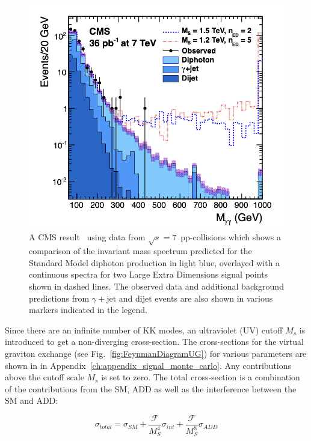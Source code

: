 \begin{figure}
    \centering
    \includegraphics[scale=0.6]{fig/InvariantMass.png}
    \caption{A CMS result~\cite{CMS:2011uvc} using data from $\sqrt{s} = 7$~\TeV pp-collisions which shows a comparison of the invariant mass spectrum predicted for the Standard Model diphoton production in light blue, overlayed with a continuous spectra for two Large Extra Dimensions signal points shown in dashed lines. The observed data and additional background predictions from $\gamma+$jet and dijet events are also shown in various markers indicated in the legend.}
    \label{fig:CMSModelDiphotonInvMass}
\end{figure}


Since there are an infinite number of KK modes, an ultraviolet (UV) cutoff $M_s$ is introduced to get a non-diverging cross-section. The cross-sections for the virtual graviton exchange (see Fig.~\ref{fig:FeynmanDiagramUG}) for various parameters are shown in in Appendix~\ref{ch:appendix_signal_monte_carlo}. Any contributions above the cutoff scale $M_s$ is set to zero. The total cross-section is a combination of the contributions from the SM, ADD as well as the interference between the SM and ADD:

\begin{equation}
\sigma_{total} = \sigma_{SM} + \frac{\mathcal{F}}{M^4_{S}} \sigma_{int}+\frac{\mathcal{F}}{M^8_{S}} \sigma_{ADD} 
\label{eq:totalADDxsec}
\end{equation}

